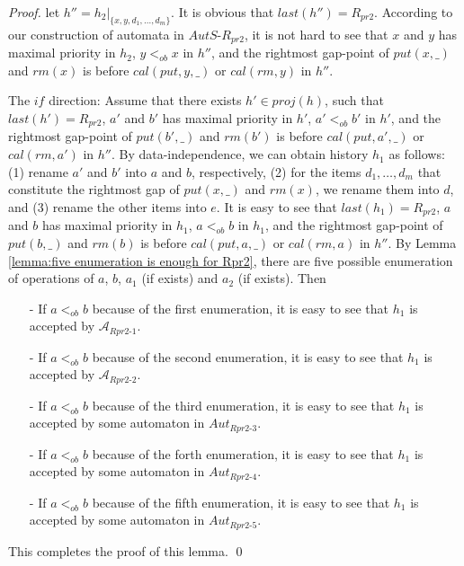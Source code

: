 \begin {proof}
let $h'' = h_2 \vert_{ \{ x,y,d_1,\ldots,d_m \} }$. It is obvious that $\textit{last}(h'') = R_{\textit{pr2}}$. According to our construction of automata in $\textit{AutS-R}_{\textit{pr2}}$, it is not hard to see that $x$ and $y$ has maximal priority in $h_2$, $y <_{\textit{ob}} x$ in $h''$, and the rightmost gap-point of $\textit{put}(x,\_)$ and $\textit{rm}(x)$ is before $\textit{cal}(\textit{put},y,\_)$ or $\textit{cal}(\textit{rm},y)$ in $h''$. %

\noindent The $\textit{if}$ direction: Assume that there exists $h' \in \textit{proj}(h)$, such that $\textit{last}(h') = R_{\textit{pr2}}$, $a'$ and $b'$ has maximal priority in $h'$, $a' <_{\textit{ob}} b'$ in $h'$, and the rightmost gap-point of $\textit{put}(b',\_)$ and $\textit{rm}(b')$ is before $\textit{cal}(\textit{put},a',\_)$ or $\textit{cal}(\textit{rm},a')$ in $h''$. By data-independence, we can obtain history $h_1$ as follows: (1) rename $a'$ and $b'$ into $a$ and $b$, respectively, (2) for the items $d_1,\ldots,d_m$ that constitute the rightmost gap of $\textit{put}(x,\_)$ and $\textit{rm}(x)$, we rename them into $d$, and (3) rename the other items into $e$. It is easy to see that $\textit{last}(h_1) = R_{\textit{pr2}}$, $a$ and $b$ has maximal priority in $h_1$, $a <_{\textit{ob}} b$ in $h_1$, and the rightmost gap-point of $\textit{put}(b,\_)$ and $\textit{rm}(b)$ is before $\textit{cal}(\textit{put},a,\_)$ or $\textit{cal}(\textit{rm},a)$ in $h''$. By Lemma \ref{lemma:five enumeration is enough for Rpr2}, there are five possible enumeration of operations of $a$, $b$, $a_1$ (if exists) and $a_2$ (if exists). Then


\begin{itemize}
\setlength{\itemsep}{0.5pt}
\item[-] If $a <_{\textit{ob}} b$ because of the first enumeration, it is easy to see that $h_1$ is accepted by $\mathcal{A}_{\textit{Rpr2-1}}$.

\item[-] If $a <_{\textit{ob}} b$ because of the second enumeration, it is easy to see that $h_1$ is accepted by $\mathcal{A}_{\textit{Rpr2-2}}$.

\item[-] If $a <_{\textit{ob}} b$ because of the third enumeration, it is easy to see that $h_1$ is accepted by some automaton in $\textit{Aut}_{\textit{Rpr2-3}}$.

\item[-] If $a <_{\textit{ob}} b$ because of the forth enumeration, it is easy to see that $h_1$ is accepted by some automaton in $\textit{Aut}_{\textit{Rpr2-4}}$.

\item[-] If $a <_{\textit{ob}} b$ because of the fifth enumeration, it is easy to see that $h_1$ is accepted by some automaton in $\textit{Aut}_{\textit{Rpr2-5}}$.
\end{itemize}

This completes the proof of this lemma. \qed
\end {proof}



